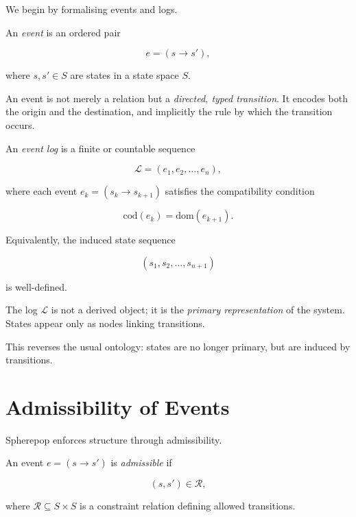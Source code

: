 \documentclass[11pt,openany]{book}
\begin{document}
We begin by formalising events and logs.

\begin{definition}[Event]
An \emph{event} is an ordered pair

$$
e = (s \to s'),
$$

where $s, s' \in S$ are states in a state space $S$.
\end{definition}

An event is not merely a relation but a \emph{directed,
typed transition}. It encodes both the origin and the
destination, and implicitly the rule by which the transition
occurs.

\begin{definition}
\label{def:log}
An \emph{event log} is a finite or countable sequence

$$
\mathcal{L} = (e_1, e_2, \ldots, e_n),
$$

where each event $e_k = (s_k \to s_{k+1})$ satisfies the
compatibility condition

$$
\mathrm{cod}(e_k) = \mathrm{dom}(e_{k+1}).
$$

Equivalently, the induced state sequence

$$
(s_1, s_2, \ldots, s_{n+1})
$$

is well-defined.
\end{definition}

\begin{remark}
The log $\mathcal{L}$ is not a derived object; it is the
\emph{primary representation} of the system. States appear
only as nodes linking transitions.
\end{remark}

This reverses the usual ontology: states are no longer
primary, but are induced by transitions.

\section{Admissibility of Events}
\label{sec:admissibility-events}

Spherepop enforces structure through admissibility.

\begin{definition}
\label{def:admissible-event}
An event $e = (s \to s')$ is \emph{admissible} if

$$
(s, s') \in \mathcal{R},
$$

where $\mathcal{R} \subseteq S \times S$ is a constraint
relation defining allowed transitions.
\end{definition}
\end{document}
